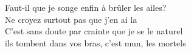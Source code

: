 \songwordfb{} Faut-il que je songe enfin à  brûler les ailes? \\
\songwordfb{} Ne croyez surtout pas que j'en ai la  \\
\songwordfb{} C'est sans doute par crainte que je se le naturel \\
 ils tombent dans vos bras, c'est mun, les mortels \\
\songwordfb{}